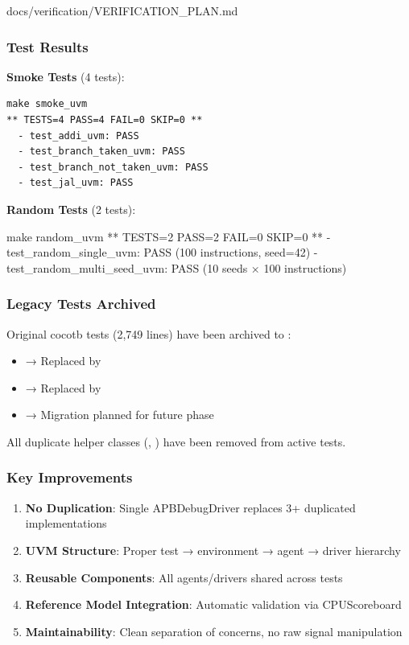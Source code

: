 \begin{relocated}{docs/verification/VERIFICATION_PLAN.md}
\subsubsection{Test Results}\label{ds:ch:verification-plan:test-results}

\textbf{Smoke Tests} (4 tests):

\begin{lstlisting}[language={}]
make smoke_uvm
** TESTS=4 PASS=4 FAIL=0 SKIP=0 **
  - test_addi_uvm: PASS
  - test_branch_taken_uvm: PASS
  - test_branch_not_taken_uvm: PASS
  - test_jal_uvm: PASS
\end{lstlisting}

\textbf{Random Tests} (2 tests):

\begin{textblock}
make random_uvm
** TESTS=2 PASS=2 FAIL=0 SKIP=0 **
  - test_random_single_uvm: PASS (100 instructions, seed=42)
  - test_random_multi_seed_uvm: PASS (10 seeds × 100 instructions)
\end{textblock}

\subsubsection{Legacy Tests Archived}\label{ds:ch:verification-plan:legacy-tests-archived}

Original cocotb tests (2,749 lines) have been archived to
:

\begin{itemize}
\tightlist
\item
   → Replaced by 
\item
   → Replaced by
\item
   → Migration planned for future phase
\end{itemize}

All duplicate helper classes (,
) have been removed from active tests.

\subsubsection{Key Improvements}\label{ds:ch:verification-plan:key-improvements}

\begin{enumerate}
\def\labelenumi{\arabic{enumi}.}
\tightlist
\item
  \textbf{No Duplication}: Single APBDebugDriver replaces 3+ duplicated
  implementations
\item
  \textbf{UVM Structure}: Proper test → environment → agent → driver
  hierarchy
\item
  \textbf{Reusable Components}: All agents/\allowbreak{}drivers shared
  across tests
\item
  \textbf{Reference Model Integration}: Automatic validation via
  CPUScoreboard
\item
  \textbf{Maintainability}: Clean separation of concerns, no raw signal
  manipulation
\end{enumerate}


\end{relocated}
